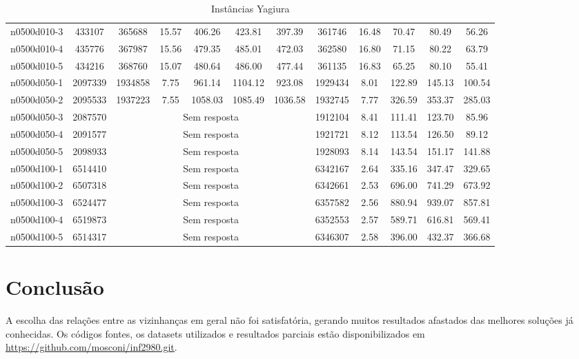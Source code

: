 \documentclass[a4paper,10pt,onecolumn]{article}
\begin{document}
{\begin{table}[htbp]
\begin{tabular*}{\linewidth}{|c|c|ccccc|ccccc|}
\\
n0500d010-3 & 433107 &
365688 & 15.57 & 406.26   & 423.81  & 397.39 
&
361746 & 16.48 & 70.47   & 80.49  & 56.26 
\\
n0500d010-4 & 435776 &
367987 & 15.56 & 479.35   & 485.01  & 472.03 
&
362580 & 16.80 & 71.15   & 80.22  & 63.79 
\\
n0500d010-5 & 434216 &
368760 & 15.07 & 480.64   & 486.00  & 477.44 
&
361135 & 16.83 & 65.25   & 80.10  & 55.41 
\\
n0500d050-1 & 2097339 &
1934858 & 7.75 & 961.14   & 1104.12  & 923.08 
&
1929434 & 8.01 & 122.89   & 145.13  & 100.54 
\\
n0500d050-2 & 2095533 &
1937223 & 7.55 & 1058.03   & 1085.49  & 1036.58 
&
1932745 & 7.77 & 326.59   & 353.37  & 285.03 
\\
n0500d050-3 & 2087570 &
\multicolumn{5}{|c|}{Sem resposta}
&
1912104 & 8.41 & 111.41   & 123.70  & 85.96 
\\
n0500d050-4 & 2091577 &
\multicolumn{5}{|c|}{Sem resposta}
&
1921721 & 8.12 & 113.54   & 126.50  & 89.12 
\\
n0500d050-5 & 2098933 &
\multicolumn{5}{|c|}{Sem resposta}
&
1928093 & 8.14 & 143.54   & 151.17  & 141.88 
\\
n0500d100-1 & 6514410 &
\multicolumn{5}{|c|}{Sem resposta}
&
6342167 & 2.64 & 335.16   & 347.47  & 329.65 
\\
n0500d100-2 & 6507318 &
\multicolumn{5}{|c|}{Sem resposta}
&
6342661 & 2.53 & 696.00   & 741.29  & 673.92 
\\
n0500d100-3 & 6524477 &
\multicolumn{5}{|c|}{Sem resposta}
&
6357582 & 2.56 & 880.94   & 939.07  & 857.81 
\\
n0500d100-4 & 6519873 &
\multicolumn{5}{|c|}{Sem resposta}
&
6352553 & 2.57 & 589.71   & 616.81  & 569.41 
\\
n0500d100-5 & 6514317 &
\multicolumn{5}{|c|}{Sem resposta}
&
6346307 & 2.58 & 396.00   & 432.37  & 366.68 
\\
    \hline
  \end{tabular*}
  \caption{Instâncias Yagiura}
  \label{table:yagiura}
\end{table}
\restoregeometry
\clearpage
}

\section{Conclusão}

A escolha das relações entre as vizinhanças em geral não foi satisfatória,
gerando muitos resultados afastados das melhores soluções já conhecidas.
Os códigos fontes, os datasets utilizados e resultados parciais estão
disponibilizados em \url{https://github.com/mosconi/inf2980.git}.
\end{document}
